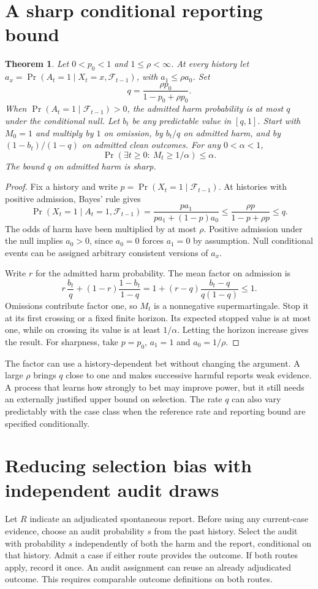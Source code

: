 \documentclass[11pt]{article}
\newtheorem{theorem}{Theorem}
\begin{document}
\section{A sharp conditional reporting bound}
\begin{theorem}
Let $0<p_0<1$ and $1\le\rho<\infty$. At every history let
$a_x=\Pr(A_t=1\mid X_t=x,\mathcal F_{t-1})$, with
$a_1\le\rho a_0$. Set
\[
q=\frac{\rho p_0}{1-p_0+\rho p_0}.
\]
When $\Pr(A_t=1\mid\mathcal F_{t-1})>0$, the admitted
harm probability is at most $q$ under the conditional null.
Let $b_t$ be any predictable value in $[q,1]$. Start with $M_0=1$
and multiply by $1$ on omission, by $b_t/q$ on admitted harm,
and by $(1-b_t)/(1-q)$ on admitted clean outcomes.
For any $0<\alpha<1$,
\[
\Pr\!\left(\exists t\ge0:\ M_t\ge 1/\alpha\right)\le\alpha .
\]
The bound $q$ on admitted harm is sharp.
\end{theorem}
\begin{proof}
Fix a history and write $p=\Pr(X_t=1\mid\mathcal F_{t-1})$.
At histories with positive admission, Bayes' rule gives
\[
\Pr(X_t=1\mid A_t=1,\mathcal F_{t-1})
 =\frac{p a_1}{p a_1+(1-p)a_0}
 \le \frac{\rho p}{1-p+\rho p}
 \le q .
\]
The odds of harm have been multiplied by at most $\rho$.
Positive admission under the null implies $a_0>0$, since
$a_0=0$ forces $a_1=0$ by assumption. Null conditional events
can be assigned arbitrary consistent versions of $a_x$.

Write $r$ for the admitted harm probability. The mean factor
on admission is
\[
r\,\frac{b_t}{q}+(1-r)\frac{1-b_t}{1-q}
 =1+(r-q)\frac{b_t-q}{q(1-q)}\le1 .
\]
Omissions contribute factor one, so $M_t$ is a nonnegative
supermartingale. Stop it at its first crossing or a fixed finite
horizon. Its expected stopped value is at most one, while on
crossing its value is at least $1/\alpha$. Letting the horizon
increase gives the result. For sharpness, take $p=p_0$,
$a_1=1$ and $a_0=1/\rho$.
\end{proof}

The factor can use a history-dependent bet without changing the
argument. A large $\rho$ brings $q$ close to one and makes
successive harmful reports weak evidence. A process that learns
how strongly to bet may improve power, but it still needs an
externally justified upper bound on selection. The rate $q$ can
also vary predictably with the case class when the reference
rate and reporting bound are specified conditionally.

\section{Reducing selection bias with independent audit draws}
Let $R$ indicate an adjudicated spontaneous report. Before using
any current-case evidence, choose an audit probability $s$ from
the past history. Select the audit with probability $s$ independently
of both the harm and the report, conditional on that history.
Admit a case if either route provides the outcome. If both routes
apply, record it once. An audit assignment can reuse an already
adjudicated outcome. This requires comparable outcome definitions
on both routes.
\end{document}
